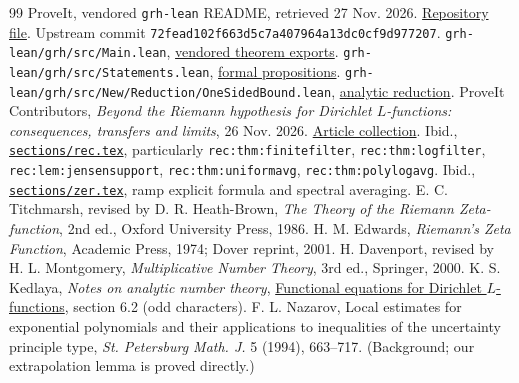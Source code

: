 \documentclass[11pt]{article}
\theoremstyle{remark}\newtheorem{remark}[theorem]{Remark}
\begin{document}
\begin{thebibliography}{99}
 ProveIt, vendored \texttt{grh-lean} README, retrieved 27 Nov. 2026. \href{https://github.com/VladimirReshetnikov/ProveIt/blob/main/Analysis/GeneralizedRiemannHypothesis/vendor/grh-lean/README.md}{Repository file}. Upstream commit \texttt{72fead102f663d5c7a407964a13dc0cf9d977207}.
 \texttt{grh-lean/grh/src/Main.lean}, \href{https://github.com/VladimirReshetnikov/ProveIt/blob/main/Analysis/GeneralizedRiemannHypothesis/vendor/grh-lean/grh/src/Main.lean}{vendored theorem exports}.
 \texttt{grh-lean/grh/src/Statements.lean}, \href{https://github.com/VladimirReshetnikov/ProveIt/blob/main/Analysis/GeneralizedRiemannHypothesis/vendor/grh-lean/grh/src/Statements.lean}{formal propositions}.
 \texttt{grh-lean/grh/src/New/Reduction/OneSidedBound.lean}, \href{https://github.com/VladimirReshetnikov/ProveIt/blob/main/Analysis/GeneralizedRiemannHypothesis/vendor/grh-lean/grh/src/New/Reduction/OneSidedBound.lean}{analytic reduction}.
 ProveIt Contributors, \emph{Beyond the Riemann hypothesis for Dirichlet $L$-functions: consequences, transfers and limits}, 26 Nov. 2026. \href{https://github.com/VladimirReshetnikov/ProveIt/tree/main/Analysis/GeneralizedRiemannHypothesis/Article}{Article collection}.
 Ibid., \href{https://github.com/VladimirReshetnikov/ProveIt/blob/main/Analysis/GeneralizedRiemannHypothesis/Article/sections/rec.tex}{\texttt{sections/rec.tex}}, particularly \texttt{rec:thm:finitefilter}, \texttt{rec:thm:logfilter}, \texttt{rec:lem:jensensupport}, \texttt{rec:thm:uniformavg}, \texttt{rec:thm:polylogavg}.
 Ibid., \href{https://github.com/VladimirReshetnikov/ProveIt/blob/main/Analysis/GeneralizedRiemannHypothesis/Article/sections/zer.tex}{\texttt{sections/zer.tex}}, ramp explicit formula and spectral averaging.
 E. C. Titchmarsh, revised by D. R. Heath-Brown, \emph{The Theory of the Riemann Zeta-function}, 2nd ed., Oxford University Press, 1986.
 H. M. Edwards, \emph{Riemann's Zeta Function}, Academic Press, 1974; Dover reprint, 2001.
 H. Davenport, revised by H. L. Montgomery, \emph{Multiplicative Number Theory}, 3rd ed., Springer, 2000.
 K. S. Kedlaya, \emph{Notes on analytic number theory}, \href{https://kskedlaya.org/ant/chap-funceq2.html}{Functional equations for Dirichlet $L$-functions}, section 6.2 (odd characters).
 F. L. Nazarov, Local estimates for exponential polynomials and their applications to inequalities of the uncertainty principle type, \emph{St. Petersburg Math. J.} 5 (1994), 663--717. (Background; our extrapolation lemma is proved directly.)
\end{thebibliography}
\end{document}
